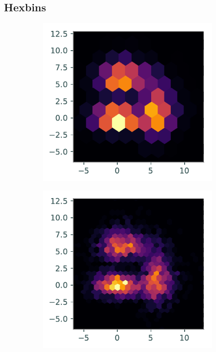 \subsection*{Hexbins} %

\begin{figure}[H] %
    \centering
    \begin{subfigure}{.47\textwidth}
        \centering
        \includegraphics[width=\textwidth]{figures/hexbin_1.pdf}
    \end{subfigure}
    \begin{subfigure}{.47\textwidth}
        \centering
        \includegraphics[width=\textwidth]{figures/hexbin_2.pdf}

\end{subfigure}
\end{figure}
